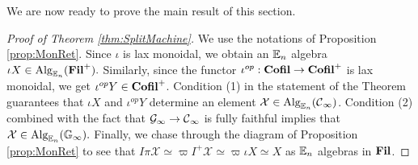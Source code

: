 We are now ready to prove the main result of this section.

\begin{proof}[Proof of Theorem \ref{thm:SplitMachine}]
We use the notations of Proposition \ref{prop:MonRet}.  Since $\iota$ is lax monoidal, we obtain an $\operatorname{\mathbb{E}}_n$ algebra $\iota X \in \operatorname{\text{Alg}}_{\operatorname{\mathbb{E}}_n}(\operatorname{\textbf{Fil}}^+).$  
Similarly, since the functor $\iota^{op}: \operatorname{\textbf{Cofil}} \to \operatorname{\textbf{Cofil}}^+$ is lax monoidal, we get $\iota^{op}Y \in \operatorname{\textbf{Cofil}}^+$.  %
Condition (1) in the statement of the Theorem guarantees that $\iota X$ and $\iota^{op}Y$ determine an element $\mathcal{X} \in \operatorname{\text{Alg}}_{\operatorname{\mathbb{E}}_n}(\operatorname{\mathcal{C}}_{\infty})$.  Condition (2) combined with the fact that $\mathcal{G}_\infty \to \operatorname{\mathcal{C}}_\infty$ is fully faithful implies that $\mathcal{X} \in \operatorname{\text{Alg}}_{\operatorname{\mathbb{E}}_n}(\operatorname{\mathbb{G}}_\infty).$  Finally, we chase through the diagram of Proposition \ref{prop:MonRet} to see that $I\pi \mathcal{X} \simeq \varpi I^+ \mathcal{X} \simeq \varpi \iota X \simeq X$ as $\operatorname{\mathbb{E}}_n$ algebras in $\operatorname{\textbf{Fil}}$.  
\end{proof}




